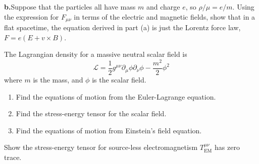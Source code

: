 \begin{exercises}
\begin{xca}
\medbreak
\noindent\textbf{b.\quad}Suppose that the particles all have mass
$m$ and charge $e$, so $\rho/\mu = e/m$. Using the expression for
$F_{\mu\nu}$ in terms of the electric and magnetic fields, show
that in a flat spacetime, the equation derived in part (a) is
just the Lorentz force law, $F = e(E + v \times B)$.
\end{xca}
\begin{xca}
The Lagrangian density for a massive neutral scalar field is
\begin{equation}
\mathcal{L}=\frac{1}{2}g^{\mu\nu}\partial_{\mu}\phi\partial_{\nu}\phi-\frac{m^{2}}{2}\phi^{2}
\end{equation}
where $m$ is the mass, and $\phi$ is the scalar field.
\begin{enumerate}
\item Find the equations of motion from the Euler-Lagrange
  equation.
\item Find the stress-energy tensor for the scalar field.
\item Find the equations of motion from Einstein's field equation.
\end{enumerate}
\end{xca}
\begin{xca}
Show the stress-energy tensor for source-less electromagnetism $T^{\mu\nu}_{\text{EM}}$ has zero trace.
\end{xca}
\end{exercises}
